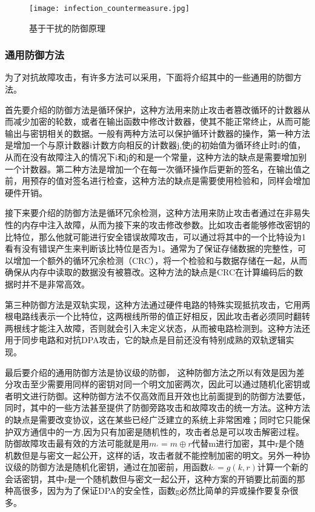 \documentclass[a4paper,12pt]{article}
\begin{document}
\begin{CJK}{UTF8}{gkai}
\begin{figure}
\centering
\caption{基于干扰的防御原理}
\texttt{[image: infection\_countermeasure.jpg]}
\label{infection_countermeasure}
\end{figure}

\subsubsection{通用防御方法}
为了对抗故障攻击，有许多方法可以采用，下面将介绍其中的一些通用的防御方法。

首先要介绍的防御方法是循环保护，这种方法用来防止攻击者篡改循环的计数器从而减少加密的轮数，或者在输出函数中修改计数器，使其不能正常终止，从而可能输出与密钥相关的数据。一般有两种方法可以保护循环计数器的操作，第一种方法是增加一个与原计数器i计数方向相反的计数器j,使j的初始值为循环终止时i的值，从而在没有故障注入的情况下i和j的和是一个常量，这种方法的缺点是需要增加别一个计数器。第二种方法是增加一个在每一次循环操作后更新的签名，在输出值之前，用预存的值对签名进行检查，这种方法的缺点是需要使用检验和，同样会增加硬件开销。

接下来要介绍的防御方法是循环冗余检测，这种方法用来防止攻击者通过在非易失性的内存中注入故障，从而为接下来的攻击修改参数。比如攻击者能够修改密钥的比特位，那么他就可能进行安全错误故障攻击，可以通过将其中的一个比特设为1看有没有错误产生来判断该比特位是否为1。通常为了保证存储数据的完整性，可以增加一个额外的循环冗余检测（CRC），将一个检验和与数据存储在一起，从而确保从内存中读取的数据没有被篡改。这种方法的缺点是CRC在计算编码后的数据时并不是非常高效。

第三种防御方法是双轨实现，这种方法通过硬件电路的特殊实现抵抗攻击，它用两根电路线表示一个比特位，这两根线所带的值正好相反，因此攻击者必须同时翻转两根线才能注入故障，否则就会引入未定义状态，从而被电路检测到。这种方法还用于同步电路和对抗DPA攻击，它的缺点是目前还没有特别成熟的双轨逻辑实现。

最后要介绍的通用防御方法是协议级的防御， 这种防御方法之所以有效是因为差分攻击至少需要用同样的密钥对同一个明文加密两次，因此可以通过随机化密钥或者明文进行防御。这种防御方法不仅高效而且开效也比前面提到的防御方法要低，同时，其中的一些方法甚至提供了防御旁路攻击和故障攻击的统一方法。这种方法的缺点是需要改变协议，这在某些已经广泛建立的系统上非常困难；同时它只能保护双方通信中的一方,因为只有加密是随机性的，攻击者总是可以攻击解密过程。防御故障攻击最有效的方法可能就是用$m_' = m \oplus r$代替m进行加密，其中r是个随机数但是与密文一起公开，这样的话，攻击者就不能控制加密的明文。另外一种协议级的防御方法是随机化密钥，通过在加密前，用函数$k_' = g(k,r)$计算一个新的会话密钥，其中r是一个随机数但与密文一起公开，这种方案的开销要比前面的那种高很多，因为为了保证DPA的安全性，函数g必然比简单的异或操作要复杂很多。


\end{CJK}
\end{document}
